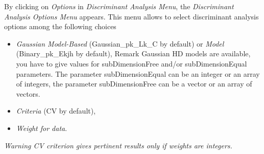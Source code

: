 By clicking on {\em Options} in {\em
Discriminant Analysis Menu}, the {\em Discriminant Analysis Options Menu} appears.
This menu  allows to select discriminant analysis options
among the following choices
\begin{itemize}
  \item {\em Gaussian Model-Based}  (Gaussian\_pk\_Lk\_C by default) or {\em Model} (Binary\_pk\_Ekjh by default),
{\noindent Remark Gaussian HD models are available, you have to give values for subDimensionFree and/or
subDimensionEqual parameters. The parameter subDimensionEqual can be an integer or an array of integers, the
parameter subDimensionFree can be a vector or an array of vectors.}

  \item {\em Criteria} (CV by default),
  \item {\em Weight for data}.
\end{itemize}

{\it Warning CV criterion gives pertinent results only if weights are integers.}











